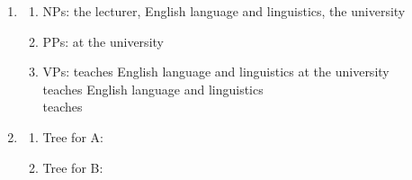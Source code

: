 \documentclass[12pt, a4paper]{article}
\begin{document}
\begin{enumerate}
  \item 
    \begin{enumerate}
      \item NPs: the lecturer, English language and linguistics, the university

      \item PPs: at the university

      \item VPs: teaches English language and linguistics at the university\\ 
        \qquad teaches English language and linguistics\\ 
        \qquad teaches
    \end{enumerate}

  \item 
    \begin{enumerate}
      \item Tree for A:\\
      \item Tree for B:\\
    \end{enumerate}
\end{enumerate}
\end{document}
